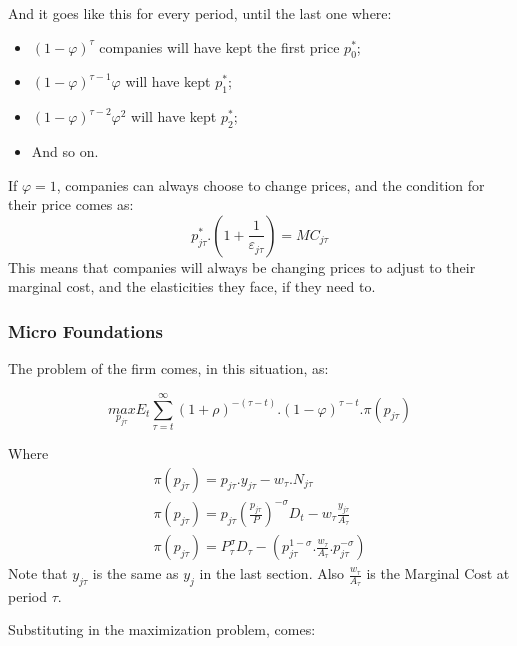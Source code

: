 And it goes like this for every period, until the last one where: 
\begin{itemize}
    \item $(1-\varphi)^{\tau}$ companies will have kept the first price $p^{*}_{0}$;
    \item $(1-\varphi)^{\tau -1}\varphi$ will have kept $p^{*}_{1}$;
    \item $(1-\varphi)^{\tau - 2}\varphi^2$ will have kept $p^{*}_{2}$;
    \item And so on.
\end{itemize}

If $\varphi =1$, companies can always choose to change prices, and the condition for their price comes as: 
\begin{equation*}
    p^{*}_{j\tau}.(1+\frac{1}{\varepsilon_{j\tau}})=MC_{j\tau}
\end{equation*}
This means that companies will always be changing prices to adjust to their marginal cost, and the elasticities they face, if they need to. 

\paragraph{}
\subsubsection{Micro Foundations}
The problem of the firm comes, in this situation, as: 

\begin{equation*}
    \underset{p_{j\tau}}{max} E_{t}\sum_{\tau=t}^{\infty}(1+\rho)^{-(\tau-t)}.(1-\varphi)^{\tau-t}.\pi(p_{j\tau})
\end{equation*}

Where 
\begin{equation*}
\begin{aligned}
\pi(p_{j\tau})=p_{j\tau}.y_{j\tau}-w_{\tau}.N_{j\tau} \\
\pi(p_{j\tau})=p_{j\tau}(\frac{p_{j\tau}}{P})^{-\sigma}D_{t}-w_{\tau}\frac{y_{j\tau}}{A_{\tau}} \\
\pi(p_{j\tau})=P_{\tau}^{\sigma}D_{\tau}-(p_{j\tau}^{1-\sigma}.\frac{w_{\tau}}{A_{\tau}}.p_{j\tau}^{-\sigma})
\end{aligned}
\end{equation*}
Note that $y_{j\tau}$ is the same as $y_{j}$ in the last section. Also $\frac{w_{\tau}}{A_{\tau}}$ is the Marginal Cost at period $\tau$.

Substituting in the maximization problem, comes:

